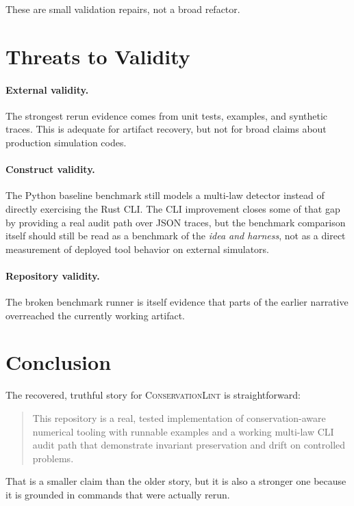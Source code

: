 \documentclass[11pt]{article}
\begin{document}
These are small validation repairs, not a broad refactor.

\section{Threats to Validity}
\paragraph{External validity.}
The strongest rerun evidence comes from unit tests, examples, and synthetic traces. This is adequate for artifact recovery, but not for broad claims about production simulation codes.

\paragraph{Construct validity.}
The Python baseline benchmark still models a multi-law detector instead of directly exercising the Rust CLI. The CLI improvement closes some of that gap by providing a real audit path over JSON traces, but the benchmark comparison itself should still be read as a benchmark of the \emph{idea and harness}, not as a direct measurement of deployed tool behavior on external simulators.

\paragraph{Repository validity.}
The broken benchmark runner is itself evidence that parts of the earlier narrative overreached the currently working artifact.

\section{Conclusion}
The recovered, truthful story for \textsc{ConservationLint} is straightforward:

\begin{quote}
This repository is a real, tested implementation of conservation-aware numerical tooling with runnable examples and a working multi-law CLI audit path that demonstrate invariant preservation and drift on controlled problems.
\end{quote}

That is a smaller claim than the older story, but it is also a stronger one because it is grounded in commands that were actually rerun.
\end{document}
